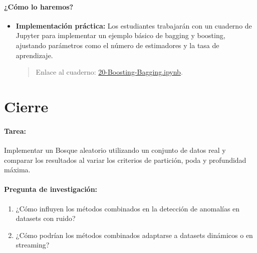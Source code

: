 \documentclass[a4,11pt]{aleph-notas}
\begin{document}
\paragraph{¿Cómo lo haremos?}  
\begin{itemize}[leftmargin=*]
    \item \textbf{Implementación práctica:}  
    Los estudiantes trabajarán con un cuaderno de Jupyter para implementar un ejemplo básico de bagging y boosting, ajustando parámetros como el número de estimadores y la tasa de aprendizaje.
    \begin{quote}
        Enlace al cuaderno: \href{https://colab.research.google.com/github/andres-merino/AprendizajeAutomaticoInicial-05-N0105/blob/main/2-Notebooks/20-Boosting-Bagging.ipynb}{20-Boosting-Bagging.ipynb}.
    \end{quote}
\end{itemize}


\section*{Cierre}  

\paragraph{Tarea:}  
Implementar un Bosque aleatorio utilizando un conjunto de datos real y comparar los resultados al variar los criterios de partición, poda y profundidad máxima.  

\paragraph{Pregunta de investigación:}  
\begin{enumerate}[leftmargin=*]  
    \item ¿Cómo influyen los métodos combinados en la detección de anomalías en datasets con ruido?
    \item ¿Cómo podrían los métodos combinados adaptarse a datasets dinámicos o en streaming?
\end{enumerate}  
\end{document}

